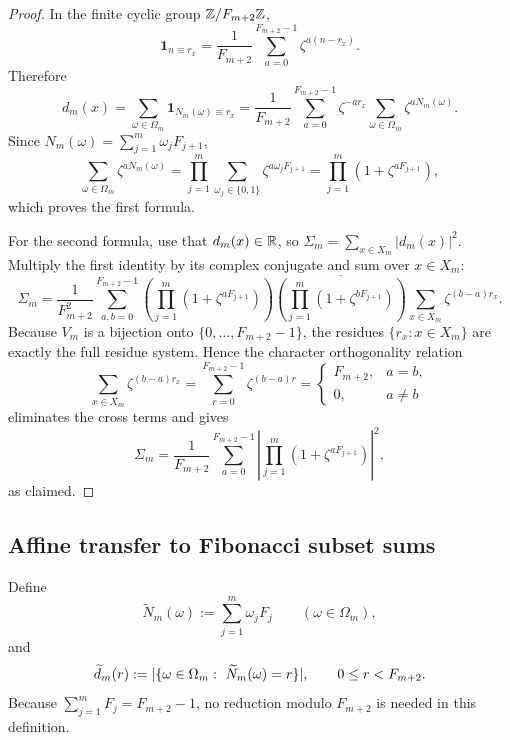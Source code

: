 \begin{proof}
In the finite cyclic group \(\mathbb{Z}/F_{m+2}\mathbb{Z}\),
\[
  \mathbf{1}_{n\equiv r_x}
  =
  \frac{1}{F_{m+2}}
  \sum_{a=0}^{F_{m+2}-1}\zeta^{a(n-r_x)}.
\]
Therefore
\[
  d_m(x)
  =
  \sum_{\omega\in\Omega_m}\mathbf{1}_{N_m(\omega)\equiv r_x}
  =
  \frac{1}{F_{m+2}}
  \sum_{a=0}^{F_{m+2}-1}
  \zeta^{-ar_x}
  \sum_{\omega\in\Omega_m}\zeta^{aN_m(\omega)}.
\]
Since \(N_m(\omega)=\sum_{j=1}^m \omega_jF_{j+1}\),
\[
  \sum_{\omega\in\Omega_m}\zeta^{aN_m(\omega)}
  =
  \prod_{j=1}^m\sum_{\omega_j\in\{0,1\}}\zeta^{a\omega_jF_{j+1}}
  =
  \prod_{j=1}^m(1+\zeta^{aF_{j+1}}),
\]
which proves the first formula.

For the second formula, use that \(d_m(x)\in\mathbb{R}\), so
\(\Sigma_m=\sum_{x\in X_m}|d_m(x)|^2\).  Multiply the first identity by its
complex conjugate and sum over \(x\in X_m\):
\[
  \Sigma_m
  =
  \frac{1}{F_{m+2}^2}
  \sum_{a,b=0}^{F_{m+2}-1}
  \left(
    \prod_{j=1}^m(1+\zeta^{aF_{j+1}})
  \right)
  \overline{
    \left(
      \prod_{j=1}^m(1+\zeta^{bF_{j+1}})
    \right)
  }
  \sum_{x\in X_m}\zeta^{(b-a)r_x}.
\]
Because \(V_m\) is a bijection onto \(\{0,\dots,F_{m+2}-1\}\), the residues
\(\{r_x:x\in X_m\}\) are exactly the full residue system.  Hence the character
orthogonality relation
\[
  \sum_{x\in X_m}\zeta^{(b-a)r_x}
  =
  \sum_{r=0}^{F_{m+2}-1}\zeta^{(b-a)r}
  =
  \begin{cases}
    F_{m+2}, & a=b,\\
    0, & a\neq b
  \end{cases}
\]
eliminates the cross terms and gives
\[
  \Sigma_m
  =
  \frac{1}{F_{m+2}}
  \sum_{a=0}^{F_{m+2}-1}
  \left|
    \prod_{j=1}^m(1+\zeta^{aF_{j+1}})
  \right|^2,
\]
as claimed.
\end{proof}

\subsection{Affine transfer to Fibonacci subset sums}

\begin{definition}
\label{def:shifted-spectrum}
Define
\[
  \widetilde N_m(\omega):=\sum_{j=1}^m \omega_jF_j
  \qquad (\omega\in\Omega_m),
\]
and
\[
  \widetilde d_m(r):=
  \lvert \{\omega\in\Omega_m:\ \widetilde N_m(\omega)=r\} \rvert,
  \qquad 0\le r<F_{m+2}.
\]
Because \(\sum_{j=1}^m F_j=F_{m+2}-1\), no reduction modulo \(F_{m+2}\) is
needed in this definition.
\end{definition}

